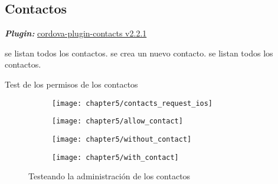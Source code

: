 \subsection{Contactos}
\textbf{\emph{Plugin:}} \href{https://www.npmjs.com/package/cordova-plugin-contacts}{cordova-plugin-contacts v2.2.1}
\begin{algorithm}
	\begin{algorithmic}[1]
		\STATE se listan todos los contactos.
		\STATE se crea un nuevo contacto.
		\STATE se listan todos los contactos.
	\end{algorithmic}
	\caption{Test de los permisos de los contactos}\label{alg:chap5:test_contactos}
\end{algorithm}
\begin{figure}[!ht]
	\begin{subfigure}{.24\textwidth}
	    \centering
		\texttt{[image: chapter5/contacts\_request\_ios]}
		\label{fig:chapter05:allow_contact_ios}
	\end{subfigure}
	\begin{subfigure}{.24\textwidth}
	    \centering
		\texttt{[image: chapter5/allow\_contact]}
		\label{fig:chapter05:allow_contact_android}
	\end{subfigure}		
	\begin{subfigure}{.25\textwidth}
	    \centering
		\texttt{[image: chapter5/without\_contact]}
		\label{fig:chapter05:without_contact}
	\end{subfigure}
	\begin{subfigure}{.25\textwidth}
	    \centering
		\texttt{[image: chapter5/with\_contact]}
		\label{fig:chapter05:with_contact}
	\end{subfigure}
	\caption{Testeando la administraci\'on de los contactos}
	\label{fig:chapter05:contact_test}
\end{figure}
\newpage
